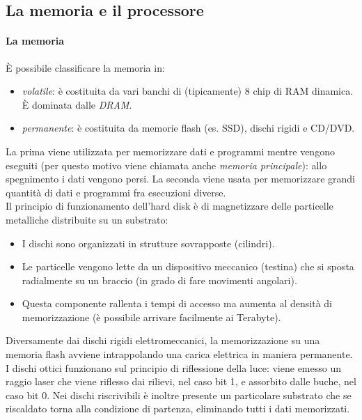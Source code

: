\subsection{La memoria e il processore}
\paragraph*{La memoria}
\`{E} possibile classificare la memoria in:
\begin{itemize}[noitemsep]
	\item \textit{volatile}: è costituita da vari banchi di (tipicamente) 8 chip di RAM dinamica. \`{E} dominata dalle \textit{DRAM}.
	\item \textit{permanente}: è costituita da memorie flash (es. SSD), dischi rigidi e CD/DVD.
\end{itemize}
La prima viene utilizzata per memorizzare dati e programmi mentre vengono eseguiti (per questo motivo viene chiamata anche \textit{memoria principale}): allo spegnimento i dati vengono persi. La seconda viene usata per memorizzare grandi quantità di dati e programmi fra esecuzioni diverse.\\
Il principio di funzionamento dell'hard disk è di magnetizzare delle particelle metalliche distribuite su un substrato:
\begin{itemize}[noitemsep]
	\item I dischi sono organizzati in strutture sovrapposte (cilindri).
	\item Le particelle vengono lette da un dispositivo meccanico (testina) che si sposta radialmente su un braccio (in grado di fare movimenti angolari).
	\item Questa componente rallenta i tempi di accesso ma aumenta al densità di memorizzazione (è possibile arrivare facilmente ai Terabyte).
\end{itemize}

Diversamente dai dischi rigidi elettromeccanici, la memorizzazione su una memoria flash avviene intrappolando una carica elettrica in maniera permanente.\\
I dischi ottici funzionano sul principio di riflessione della luce: viene emesso un raggio laser che viene riflesso dai rilievi, nel caso bit 1, e assorbito dalle buche, nel caso bit 0. Nei dischi riscrivibili è inoltre presente un particolare substrato che se riscaldato torna alla condizione di partenza, eliminando tutti i dati memorizzati.

